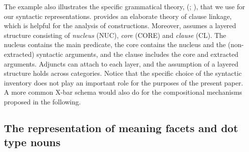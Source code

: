\documentclass[output=paper,colorlinks,citecolor=brown,chinesefont]{langscibook}
\begin{document}
The example also illustrates the specific grammatical theory,  (; \citealt{vanValin:2005,Bentley/Mairal/Nakamura/VanValin:2023}), that we use for our syntactic representations.
 provides an elaborate theory of clause linkage, which is helpful for the analysis of  constructions.
Moreover,  assumes a layered structure consisting of \emph{nucleus} (NUC), \emph{core} (CORE) and \emph{clause} (CL).
The nucleus contains the main predicate, the core contains the nucleus and the (non-extracted) syntactic arguments, and the clause includes the core and extracted arguments.
Adjuncts can attach to each layer, and the assumption of a layered structure holds across categories.
Notice that the specific choice of the syntactic inventory does not play an important role for the purposes of the present paper. 
A more common X-bar schema would also do for the compositional mechanisms proposed in the following.

\subsection{The representation of meaning facets and dot type nouns}
\end{document}
